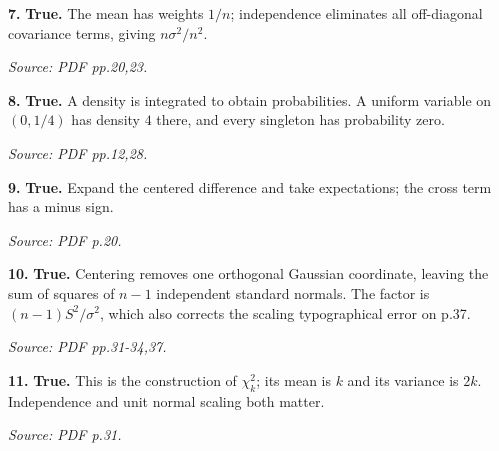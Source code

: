 \documentclass[11pt,a4paper]{article}
\begin{document}
\par\noindent\begin{minipage}{\linewidth}
\textbf{7.} \textbf{True.} The mean has weights \(1/n\); independence eliminates all off-diagonal covariance terms, giving \(n\sigma^2/n^2\).

{\footnotesize\textit{Source: PDF pp.20,23.}}
\end{minipage}\par\vspace{3mm}
\par\noindent\begin{minipage}{\linewidth}
\textbf{8.} \textbf{True.} A density is integrated to obtain probabilities. A uniform variable on \((0,1/4)\) has density \(4\) there, and every singleton has probability zero.

{\footnotesize\textit{Source: PDF pp.12,28.}}
\end{minipage}\par\vspace{3mm}
\par\noindent\begin{minipage}{\linewidth}
\textbf{9.} \textbf{True.} Expand the centered difference and take expectations; the cross term has a minus sign.

{\footnotesize\textit{Source: PDF p.20.}}
\end{minipage}\par\vspace{3mm}
\par\noindent\begin{minipage}{\linewidth}
\textbf{10.} \textbf{True.} Centering removes one orthogonal Gaussian coordinate, leaving the sum of squares of \(n-1\) independent standard normals. The factor is \((n-1)S^2/\sigma^2\), which also corrects the scaling typographical error on p.37.

{\footnotesize\textit{Source: PDF pp.31-34,37.}}
\end{minipage}\par\vspace{3mm}
\par\noindent\begin{minipage}{\linewidth}
\textbf{11.} \textbf{True.} This is the construction of \(\chi_k^2\); its mean is \(k\) and its variance is \(2k\). Independence and unit normal scaling both matter.

{\footnotesize\textit{Source: PDF p.31.}}
\end{minipage}\par\vspace{3mm}
\end{document}

